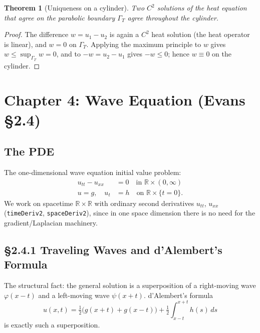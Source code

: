 ﻿\documentclass[12pt, a4paper]{article}
\renewcommand{\_}{\origunderscore\allowbreak}
\theoremstyle{definition}
\theoremstyle{plain}
\newtheorem{theorem}{Theorem}[section]
\begin{document}
\begin{theorem}[Uniqueness on a cylinder]
Two $C^2$ solutions of the heat equation that agree on the parabolic boundary $\Gamma_T$ agree
throughout the cylinder.
\end{theorem}

\begin{proof}
The difference $w=u_1-u_2$ is again a $C^2$ heat solution (the heat operator is linear), and
$w=0$ on $\Gamma_T$. Applying the maximum principle to $w$ gives $w\le\sup_{\Gamma_T}w=0$, and to
$-w=u_2-u_1$ gives $-w\le 0$; hence $w\equiv 0$ on the cylinder.
\end{proof}

\section{Chapter 4: Wave Equation (Evans §2.4)}

\subsection{The PDE}

The one-dimensional wave equation initial value problem:
\begin{align}
  u_{tt} - u_{xx} &= 0 \quad \text{in } \mathbb{R} \times (0,\infty) \\
  u = g, \quad u_t &= h \quad \text{on } \mathbb{R} \times \{t = 0\}.
\end{align}
We work on spacetime $\mathbb{R} \times \mathbb{R}$ with ordinary second derivatives
$u_{tt}$, $u_{xx}$ (\texttt{timeDeriv2}, \texttt{spaceDeriv2}), since in one space dimension
there is no need for the gradient/Laplacian machinery.

\subsection{§2.4.1 Traveling Waves and d'Alembert's Formula}

The structural fact: the general solution is a superposition of a right-moving wave
$\varphi(x-t)$ and a left-moving wave $\psi(x+t)$. d'Alembert's formula
\begin{equation}
  u(x,t) = \tfrac{1}{2}\bigl(g(x+t) + g(x-t)\bigr)
    + \tfrac{1}{2}\int_{x-t}^{x+t} h(s)\,ds
\end{equation}
is exactly such a superposition.
\end{document}
